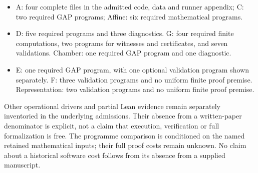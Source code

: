 \documentclass[11pt,a4paper]{article}
\begin{document}
\begin{itemize}\setlength\itemsep{1pt}
\item A: four complete files in the admitted code, data and runner appendix; C: two required GAP programs; Affine: six required mathematical programs.
\item D: five required programs and three diagnostics. G: four required finite computations, two programs for witnesses and certificates, and seven validations. Chamber: one required GAP program and one diagnostic.
\item E: one required GAP program, with one optional validation program shown separately. F: three validation programs and no uniform finite proof premise. Representation: two validation programs and no uniform finite proof premise.
\end{itemize}
Other operational drivers and partial Lean evidence remain separately inventoried in the underlying admissions. Their absence from a written-paper denominator is explicit, not a claim that execution, verification or full formalization is free. The programme comparison is conditioned on the named retained mathematical inputs; their full proof costs remain unknown. No claim about a historical software cost follows from its absence from a supplied manuscript.
\end{document}
